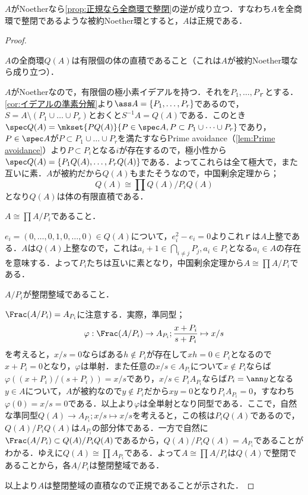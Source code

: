 \begin{thm}
	$A$がNoetherなら\ref{prop:正規なら全商環で整閉}の逆が成り立つ．すなわち$A$を全商環で整閉であるような被約Noether環とすると，$A$は正規である．
\end{thm}

\begin{proof}
	\begin{step}
		\item $A$の全商環$Q(A)$は有限個の体の直積であること（これは$A$が被約Noether環なら成り立つ）．
		
		$A$がNoetherなので，有限個の極小素イデアルを持つ．それを$P_1,\dots,P_ｒ$とする．\ref{cor:イデアルの準素分解}より$\ass A=\{P_1,\dots,P_r\}$であるので，$S=A\setminus(P_1\cup\dots\cup P_r)$とおくと$S^{-1}A=Q(A)$である．このとき$\spec Q(A)=\mkset{PQ(A)}{P\in\spec A,P\subset P_1\cup\dots\cup P_r}$であり，$P\in\spec A$が$P\subset P_1\cup\dots\cup P_r$を満たすならPrime avoidance（\ref{lem:Prime avoidance}）より$P\subset P_i$となる$i$が存在するので，極小性から$\spec Q(A)=\{P_1Q(A),\dots,P_rQ(A)\}$である．よってこれらは全て極大で，また互いに素．$A$が被約だから$Q(A)$もまたそうなので，中国剰余定理から；
		\[Q(A)\cong\prod Q(A)/P_iQ(A)\]
		となり$Q(A)$は体の有限直積である．
		
		\item $A\cong\prod A/P_i$であること．
		
		$e_i=(0,\dots,0,1,0,\dots,0)\in Q(A)$について，$e_i^2-e_i=0$よりこれｒは$A$上整である．$A$は$Q(A)$上整なので，これは$a_i+1\in\bigcap_{i\neq j}P_j,a_i\in P_i$となる$a_i\in A$の存在を意味する．よって$P_i$たちは互いに素となり，中国剰余定理から$A\cong\prod A/P_i$である．
		
		\item $A/P_i$が整閉整域であること．
		
		$\Frac(A/P_i)=A_{P_i}$に注意する．実際，準同型；
		\[\varphi:\Frac(A/P_i)\to A_{P_i};\frac{x+P_i}{s+P_i}\mapsto x/s\]
		を考えると，$x/s=0$ならばある$h\not\in P_i$が存在して$xh=0\in P_i$となるので$x+P_i=0$となり，$\varphi$は単射．また任意の$x/s\in A_{P_i}$について$x\not\in P_i$ならば$\varphi((x+P_i)/(s+P_i))=x/s$であり，$x/s\in P_iA_{P_i}$ならば$P_i=\ann y$となる$y\in A$について，$A$が被約なので$y\not\in P_i$だから$xy=0$となり$P_iA_{P_i}=0$，すなわち$\varphi(0)=x/s=0$である．以上より$\varphi$は全単射となり同型である．ここで，自然な準同型$Q(A)\to A_{P_i};x/s\mapsto x/s$を考えると，この核は$P_iQ(A)$であるので，$Q(A)/P_iQ(A)$は$A_{P_i}$の部分体である．一方で自然に$\Frac(A/P_i)\subset Q(A)/P_iQ(A)$であるから，$Q(A)/P_iQ(A)=A_{P_i}$であることがわかる．ゆえに$Q(A)\cong\prod A_{P_i}$である．よって$A\cong\prod A/P_i$は$Q(A)$で整閉であることから，各$A/P_i$は整閉整域である．
	\end{step}
	以上より$A$は整閉整域の直積なので正規であることが示された．
\end{proof}
